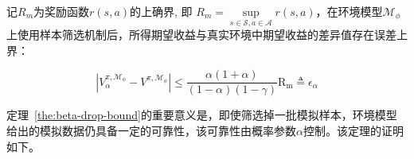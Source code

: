 \begin{theorem}\label{the:beta-drop-bound}

记$R_{m}$为奖励函数$r(s,a)$的上确界, 即 $R_{m}=\underset{s\in\mathcal{S},a\in\mathcal{A}}{\sup}r(s,a)$，在环境模型$\mathcal{M}_\phi$上使用样本筛选机制后，所得期望收益与真实环境中期望收益的差异值存在误差上界：

\begin{equation}
    |{V}_\alpha^{\pi, \mathcal{M}_{\phi}} - {V}^{\pi,\mathcal{M}_{\phi}}| \leq \frac{\alpha(1+\alpha)}{(1-\alpha)(1-\gamma)}\mathrm{R_{m}} \triangleq \epsilon_\alpha
\label{eq:eps-beta}
\end{equation}

\end{theorem}

定理~\ref{the:beta-drop-bound}的重要意义是，即使筛选掉一批模拟样本，环境模型给出的模拟数据仍具备一定的可靠性，该可靠性由概率参数$\alpha$控制。该定理的证明如下。

